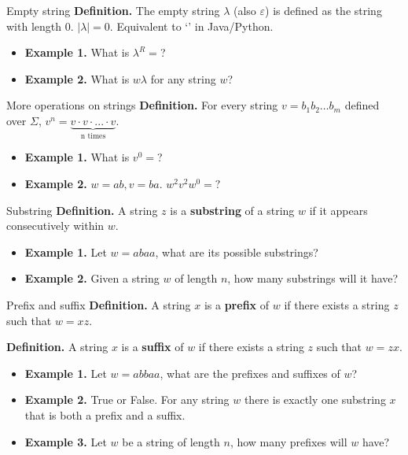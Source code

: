 \documentclass[10pt]{beamer}
\begin{document}
\begin{frame}{Empty string}
    \textbf{Definition.} The empty string $\lambda$ (also $\varepsilon$) is defined as the string with length 0. $|\lambda| = 0$. Equivalent to `' in Java/Python.
    \begin{itemize}[itemsep=5mm, parsep=0pt]
        \item \textbf{Example 1.} What is $\lambda^R = $?
        \item \textbf{Example 2.} What is $w \lambda$ for any string $w$?

    \end{itemize}
\end{frame}

\begin{frame}{More operations on strings}
    \textbf{Definition.} For every string $v = b_1b_2 \dots b_m$ defined over $\Sigma$, $v^n = \underbrace{ v \cdot v \cdot ...\cdot v}_{\text{n times}}$.
    \begin{itemize}[itemsep=5mm, parsep=0pt]
        \item \textbf{Example 1.} What is $v^0 = $?
        \item \textbf{Example 2.} $w = ab, v = ba$. $w^2v^2w^0 = ?$
    \end{itemize}
\end{frame}

\begin{frame}{Substring}
    \textbf{Definition.} A string $z$ is a \textbf{substring} of a string $w$ if it appears consecutively within $w$.
    \begin{itemize}
        \item \textbf{Example 1.} Let $w = abaa$, what are its possible substrings?
        \item \textbf{Example 2.} Given a string $w$ of length $n$, how many substrings will it have?
    \end{itemize}
\end{frame}

\begin{frame}{Prefix and suffix}
    \textbf{Definition.} A string $x$ is a \textbf{prefix} of $w$ if there exists a string $z$ such that $w = xz$.

    \textbf{Definition.} A string $x$ is a \textbf{suffix} of $w$ if there exists a string $z$ such that $w = zx$.

    \begin{itemize}
        \item \textbf{Example 1.} Let $w = abbaa$, what are the prefixes and suffixes of $w$?
        \item \textbf{Example 2.} True or False. For any string $w$ there is exactly one substring $x$ that is both a prefix and a suffix.
        \item \textbf{Example 3.} Let $w$ be a string of length $n$, how many prefixes will $w$ have?
    \end{itemize}

\end{frame}
\end{document}
